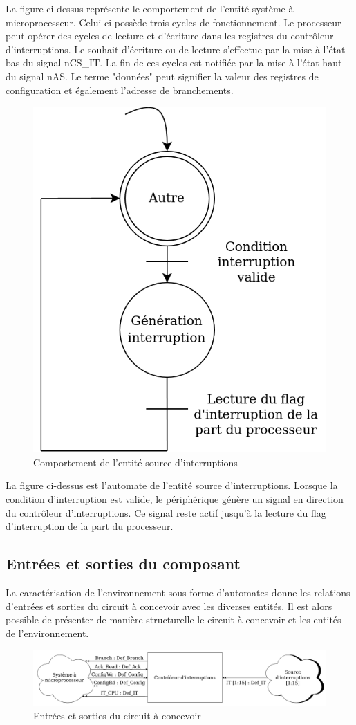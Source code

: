 La figure ci-dessus représente le comportement de l'entité système à microprocesseur.
Celui-ci possède trois cycles de fonctionnement.
Le processeur peut opérer des cycles de lecture et d'écriture dans les registres du contrôleur d'interruptions.
Le souhait d'écriture ou de lecture s'effectue par la mise à l'état bas du signal nCS\_IT.
La fin de ces cycles est notifiée par la mise à l'état haut du signal nAS.
Le terme "données" peut signifier la valeur des registres de configuration et également l'adresse de branchements.\\ 


\begin{figure}[H]
	\centering
	\includegraphics[width=0.5\linewidth]{figure/spec_automate_src_int.png}
	\caption{Comportement de l'entité source d'interruptions}
	\label{fig:spec_automate_src_it}
\end{figure} 

La figure ci-dessus est l'automate de l'entité source d'interruptions.
Lorsque la condition d'interruption est valide, le périphérique génère un signal en direction du contrôleur d'interruptions.
Ce signal reste actif jusqu'à la lecture du flag d'interruption de la part du processeur.

\subsection{Entrées et sorties du composant}

La caractérisation de l'environnement sous forme d'automates donne les relations d'entrées et sorties du circuit à concevoir avec les diverses entités.
Il est alors possible de présenter de manière structurelle le circuit à concevoir et les entités de l'environnement.

\begin{figure}[H]
	\centering
	\includegraphics[width=1\linewidth]{figure/entrees_sorties_composant.png}
	\caption{Entrées et sorties du circuit à concevoir}
	\label{fig:entrees_sorties_composant}
\end{figure} 

